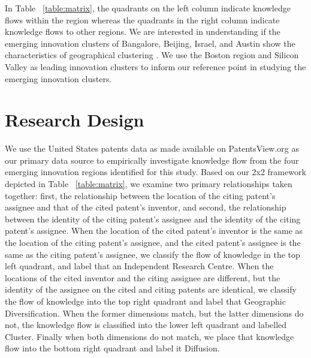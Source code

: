 \documentclass[12pt]{article}
\begin{document}
In Table ~\ref{table:matrix}, the quadrants on the left column indicate knowledge flows within the region whereas the quadrants in the right column indicate knowledge flows to other regions. We are  interested in understanding if the emerging innovation clusters of Bangalore, Beijing, Israel, and Austin show the characteristics of  geographical clustering \citep{Jaffe1993}. We use the Boston region and Silicon Valley as  leading innovation clusters to inform our reference point in studying the emerging innovation clusters.

\section{Research Design}
We use the United States patents data as made available on PatentsView.org as our primary data source to empirically investigate knowledge flow from the four emerging innovation regions identified for this study. Based on our 2x2 framework depicted in Table ~\ref{table:matrix}, we examine two primary relationships taken together: first, the relationship between the location of the citing patent's assignee and that of the cited patent's inventor, and second, the relationship between the identity of the citing patent's assignee and the identity of the citing patent's assignee. When the location of the cited patent's inventor is the same as the location of the citing patent's assignee, and the cited patent's assignee is the same as the citing patent's assignee, we classify the flow of knowledge in the top left quadrant, and label that an Independent Research Centre. When the locations of the cited inventor and the citing assignee are different, but the  identity of the assignee on the cited and citing patents are identical, we classify the flow of knowledge into the top right quadrant and label that Geographic Diversification. When the former dimensions match, but the latter dimensions do not, the knowledge flow is classified into the lower left quadrant and labelled Cluster. Finally when both dimensions do not match, we place that knowledge flow into the bottom right quadrant and label it Diffusion.
\end{document}
